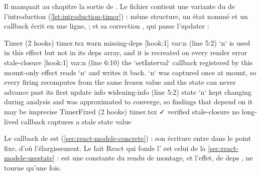 Il manquait au chapitre la sortie de . Le fichier
 contient une variante du  de l'introduction
(\cref{lst:introduction-timer}) : même structure, un état nommé  et un
callback écrit en une ligne,  ; et sa
correction
, qui passe l'updater  :

\begin{sortie}
  Timer  (2 hooks)  timer.tsx
    warn   missing-deps  [hook:1]  var:n  (line 5:2)  `n` is used in this effect but not in its deps array, and it is recreated on every render
    error  stale-closure  [hook:1]  var:n  (line 6:10)  the `setInterval` callback registered by this mount-only effect reads `n` and writes it back. `n` was captured once at mount, so every firing recomputes from the same frozen value and the state can never advance past its first update
    info   widening-info  (line 5:2)  state `n` kept changing during analysis and was approximated to converge, so findings that depend on it may be imprecise
  TimerFixed  (2 hooks)  timer.tsx  ✓
    verified  stale-closure  no long-lived callback captures a stale state value
\end{sortie}

Le callback de  est 
(\cref{sec:react-modele-concrete}) : son écriture entre dans le point fixe, d'où
l'élargissement. Le fait React qui fonde l'\Error{} est celui de la
\cref{sec:react-modele-usestate} :  est une constante du rendu de
montage, et l'effet, de deps \code{[]}, ne tourne qu'une fois.

